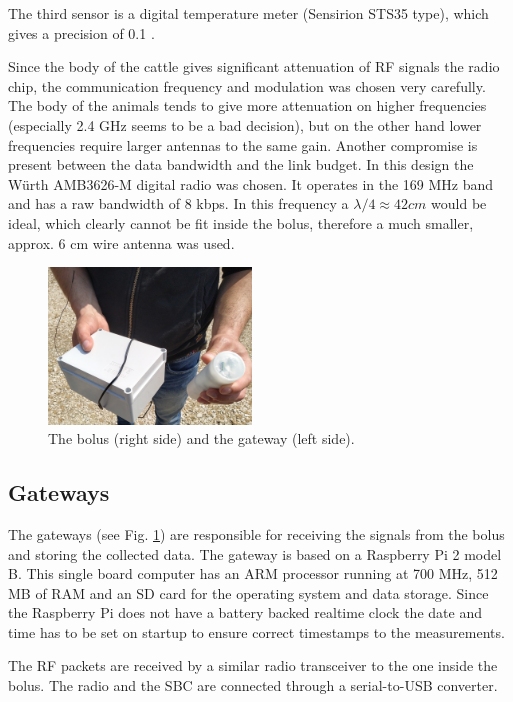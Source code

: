 \documentclass[conference]{IEEEtran}
\begin{document}
The third sensor is a digital temperature meter (Sensirion STS35 type), which gives
a precision of 0.1 \textcelsius.

Since the body of the cattle gives significant attenuation of RF signals
the radio chip, the communication frequency and modulation was chosen very
carefully. The body of the animals tends to give more attenuation on higher
frequencies (especially 2.4 GHz seems to be a bad decision), but on the
other hand lower frequencies require larger antennas to the same gain.
Another compromise is present between the data bandwidth and the link budget.
In this design the Würth AMB3626-M digital radio was chosen. It operates in the 169 MHz
band and has a raw bandwidth of 8 kbps. In this frequency a
$\lambda / 4 \approx 42 cm$ would be ideal, which clearly cannot be fit
inside the bolus, therefore a much smaller, approx. 6 cm wire antenna
was used.

\begin{figure}[htbp]
  \centerline{\includegraphics[width=0.48\textwidth]{fig/bolus_gw_photo.jpg}}
  \caption{The bolus (right side) and the gateway (left side).}
  \label{bolus-gw-photo}
\end{figure}

\subsection{Gateways}

The gateways (see Fig. \ref{bolus-gw-photo}) are responsible for receiving
the signals from the bolus and
storing the collected data. The gateway is based on a Raspberry Pi 2 model B.
This single board computer has an ARM processor running at 700 MHz, 512 MB of
RAM and an SD card for the operating system and data storage. Since the
Raspberry Pi does not have a battery backed realtime clock the date and
time has to be set on startup to ensure correct timestamps to the
measurements.

The RF packets are received by a similar radio transceiver to the one inside the
bolus. The radio and the SBC are connected through a serial-to-USB converter.
\end{document}
